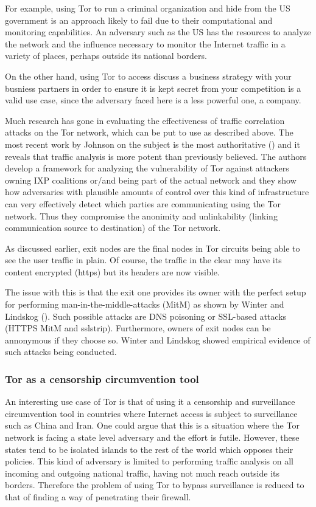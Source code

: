 \documentclass[11pt]{book} %
\begin{document}
For example, using Tor to run a criminal organization and hide from the US government is an approach likely to fail due to their computational and monitoring capabilities. An adversary such as the US has the resources to analyze the network and the influence necessary to monitor the Internet traffic in a variety of places, perhaps outside its national borders.

On the other hand, using Tor to access discuss a business strategy with your busniess partners in order to ensure it is kept secret from your competition is a valid use case, since the adversary faced here is a less powerful one, a company.

Much research has gone in evaluating the effectiveness of traffic correlation attacks on the Tor network, which can be put to use as described above. The most recent work by Johnson on the subject is the most authoritative (\citep*{captainJohnson}) and it reveals that traffic analysis is more potent than previously believed. The authors develop a framework for analyzing the vulnerability of Tor against attackers owning IXP coalitions or/and being part of the actual network and they show how adversaries with plausible amounts of control over this kind of infrastructure can very effectively detect which parties are communicating using the Tor network. Thus they compromise the anonimity and unlinkability (linking communication source to destination) of the Tor network.


As discussed earlier, exit nodes are the final nodes in Tor circuits being able to see the user traffic in plain. Of course, the traffic in the clear may have its content encrypted (https) but its headers are now visible.

The issue with this is that the exit one provides its owner with the perfect setup for performing man-in-the-middle-attacks (MitM) as shown by Winter and Lindskog (\citep*{spoiledOnions}). Such possible attacks are DNS poisoning or SSL-based attacks (HTTPS MitM and sslstrip). Furthermore, owners of exit nodes can be annonymous if they choose so. Winter and Lindskog showed empirical evidence of such attacks being conducted.

\subsubsection{Tor as a censorship circumvention tool}

An interesting use case of Tor is that of using it a censorship and surveillance circumvention tool in countries where Internet access is subject to surveillance such as China and Iran. One could argue that this is a situation where the Tor network is facing a state level adversary and the effort is futile. However, these states tend to be isolated islands to the rest of the world which opposes their policies. This kind of adversary is limited to performing traffic analysis on all incoming and outgoing national traffic, having not much reach outside its borders. Therefore the problem of using Tor to bypass surveillance is reduced to that of finding a way of penetrating their firewall.
\end{document}
